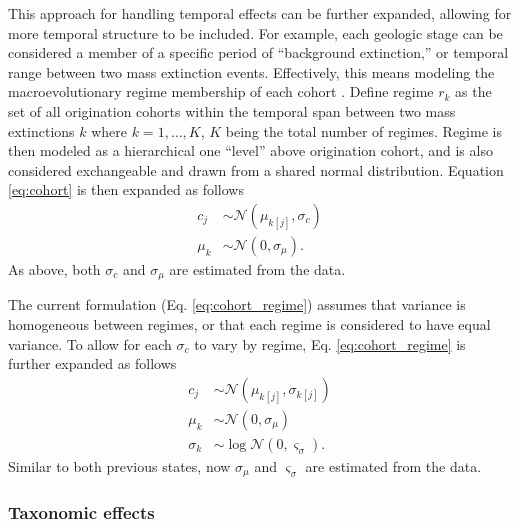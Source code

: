 \documentclass[12pt,letterpaper]{article}
\begin{document}
This approach for handling temporal effects can be further expanded, allowing for more temporal structure to be included. For example, each geologic stage can be considered a member of a specific period of ``background extinction,'' or temporal range between two mass extinction events. Effectively, this means modeling the macroevolutionary regime membership of each cohort \citep{Jablonski1987}. Define regime \(r_{k}\) as the set of all origination cohorts within the temporal span between two mass extinctions \(k\) where \(k = 1, \dots, K\), \(K\) being the total number of regimes. Regime is then modeled as a hierarchical one ``level'' above origination cohort, and is also considered exchangeable and drawn from a shared normal distribution. Equation \ref{eq:cohort} is then expanded as follows
\begin{equation}
  \begin{aligned}
    c_{j} &\sim \mathcal{N}(\mu_{k[j]}, \sigma_{c}) \\
    \mu_{k} &\sim \mathcal{N}(0, \sigma_{\mu}).
  \end{aligned}
  \label{eq:cohort_regime}
\end{equation}
As above, both \(\sigma_{c}\) and \(\sigma_{\mu}\) are estimated from the data.

The current formulation (Eq. \ref{eq:cohort_regime}) assumes that variance is homogeneous between regimes, or that each regime is considered to have equal variance. To allow for each \(\sigma_{c}\) to vary by regime, Eq. \ref{eq:cohort_regime} is further expanded as follows
\begin{equation}
  \begin{aligned}
    c_{j} &\sim \mathcal{N}(\mu_{k[j]}, \sigma_{k[j]}) \\
    \mu_{k} &\sim \mathcal{N}(0, \sigma_{\mu}) \\
    \sigma_{k} &\sim \log\mathcal{N}(0, \varsigma_{\sigma}).
  \end{aligned}
  \label{eq:temporal_complex}
\end{equation}
Similar to both previous states, now \(\sigma_{\mu}\) and \(\varsigma_{\sigma}\) are estimated from the data.


\subsubsection{Taxonomic effects}
\end{document}
